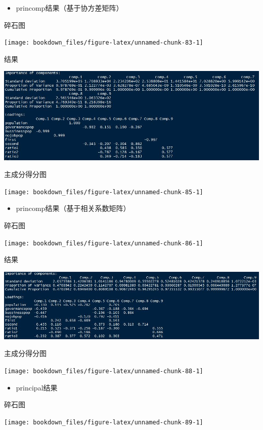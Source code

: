 \documentclass[]{ctexbook}
\providecommand{\tightlist}{%
  \setlength{\itemsep}{0pt}\setlength{\parskip}{0pt}}
\begin{document}
\begin{itemize}
\tightlist
\item
  princomp结果（基于协方差矩阵）
\end{itemize}

碎石图

\texttt{[image: bookdown\_files/figure-latex/unnamed-chunk-83-1]}

结果

\includegraphics[width=1\linewidth,height=0.35\textheight]{fig/fig37}

主成分得分图

\texttt{[image: bookdown\_files/figure-latex/unnamed-chunk-85-1]}

\begin{itemize}
\tightlist
\item
  princomp结果（基于相关系数矩阵）
\end{itemize}

碎石图

\texttt{[image: bookdown\_files/figure-latex/unnamed-chunk-86-1]}

结果

\includegraphics[width=1\linewidth,height=0.35\textheight]{fig/fig38}

主成分得分图

\texttt{[image: bookdown\_files/figure-latex/unnamed-chunk-88-1]}

\begin{itemize}
\tightlist
\item
  principal结果
\end{itemize}

碎石图

\texttt{[image: bookdown\_files/figure-latex/unnamed-chunk-89-1]}
\end{document}
